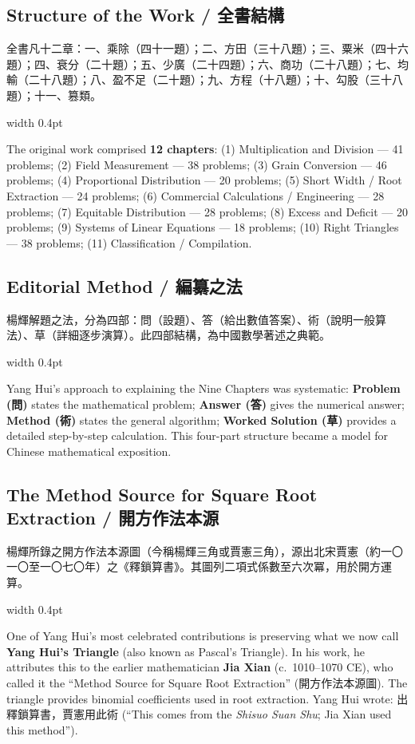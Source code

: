 \documentclass[10pt,a4paper]{article}
\newcommand{\zh}[1]{{\CJKfamily{notocjksc}#1}}
\newcommand{\bilingual}[2]{%
  \par\smallskip\noindent%
  \begin{minipage}[t]{0.47\textwidth}%
    \RaggedRight\small #1%
  \end{minipage}%
  \hfill\vrule width 0.4pt\hfill%
  \begin{minipage}[t]{0.47\textwidth}%
    \RaggedRight\small #2%
  \end{minipage}%
  \par\smallskip%
}
\begin{document}
\subsection{Structure of the Work / 全書結構}

\bilingual{
  全書凡十二章：一、\zh{乘除}（四十一題）；二、\zh{方田}（三十八題）；三、\zh{粟米}（四十六題）；四、\zh{衰分}（二十題）；五、\zh{少廣}（二十四題）；六、\zh{商功}（二十八題）；七、\zh{均輸}（二十八題）；八、\zh{盈不足}（二十題）；九、\zh{方程}（十八題）；十、\zh{勾股}（三十八題）；十一、\zh{篡類}。
}{
  The original work comprised \textbf{12 chapters}: (1) Multiplication and Division --- 41 problems; (2) Field Measurement --- 38 problems; (3) Grain Conversion --- 46 problems; (4) Proportional Distribution --- 20 problems; (5) Short Width / Root Extraction --- 24 problems; (6) Commercial Calculations / Engineering --- 28 problems; (7) Equitable Distribution --- 28 problems; (8) Excess and Deficit --- 20 problems; (9) Systems of Linear Equations --- 18 problems; (10) Right Triangles --- 38 problems; (11) Classification / Compilation.
}

\subsection{Editorial Method / 編纂之法}

\bilingual{
  楊輝解題之法，分為四部：\zh{問}（設題）、\zh{答}（給出數值答案）、\zh{術}（說明一般算法）、\zh{草}（詳細逐步演算）。此四部結構，為中國數學著述之典範。
}{
  Yang Hui's approach to explaining the Nine Chapters was systematic: \textbf{Problem (\zh{問})} states the mathematical problem; \textbf{Answer (\zh{答})} gives the numerical answer; \textbf{Method (\zh{術})} states the general algorithm; \textbf{Worked Solution (\zh{草})} provides a detailed step-by-step calculation. This four-part structure became a model for Chinese mathematical exposition.
}

\subsection{The Method Source for Square Root Extraction / 開方作法本源}

\bilingual{
  楊輝所錄之\zh{開方作法本源圖}（今稱楊輝三角或賈憲三角），源出北宋賈憲\zh{（約一〇一〇至一〇七〇年）}之《釋鎖算書》。其圖列二項式係數至六次冪，用於開方運算。
}{
  One of Yang Hui's most celebrated contributions is preserving what we now call \textbf{Yang Hui's Triangle} (also known as Pascal's Triangle). In his work, he attributes this to the earlier mathematician \textbf{Jia Xian} (c.~1010--1070 CE), who called it the ``Method Source for Square Root Extraction'' (\zh{開方作法本源圖}). The triangle provides binomial coefficients used in root extraction. Yang Hui wrote: \zh{出釋鎖算書，賈憲用此術} (``This comes from the \textit{Shisuo Suan Shu}; Jia Xian used this method'').
}
\end{document}
